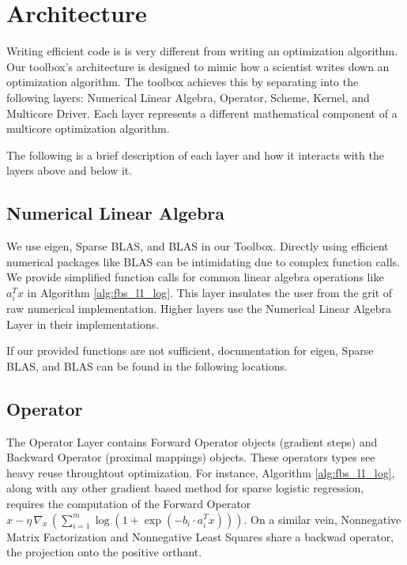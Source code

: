 \section{Architecture}

Writing efficient code is is very different from writing an optimization algorithm.
Our toolbox's architecture is designed to mimic how a scientist writes down an optimization algorithm.
The toolbox achieves this by separating into the following layers: Numerical Linear Algebra, Operator, Scheme, Kernel, and Multicore Driver.
Each layer represents a different mathematical component of a multicore optimization algorithm. 

The following is a brief description of each layer and how it interacts with the layers above and below it.

\subsection{Numerical Linear Algebra}

We use eigen, Sparse BLAS, and BLAS in our Toolbox.
Directly using efficient numerical packages like BLAS can be intimidating due to complex function calls. We provide simplified function calls for common linear algebra operations like $a_i^T x$ in Algorithm \ref{alg:fbs_l1_log}. This layer insulates the user from the grit of raw numerical implementation. Higher layers use the Numerical Linear Algebra Layer in their implementations.

If our provided functions are not sufficient, documentation for eigen, Sparse BLAS, and BLAS can be found in the following locations.

\subsection{Operator}

The Operator Layer contains Forward Operator objects (gradient steps) and Backward Operator (proximal mappings) objects. These operators types see heavy reuse throughtout optimization.
For instance, Algorithm \ref{alg:fbs_l1_log}, along with any other gradient based method for sparse logistic regression, requires the computation of the Forward Operator $x - \eta \, \nabla_x \,(\sum_{i = 1}^m \log (1 + \exp(-b_i \cdot a_i^T x)))$. On a similar vein, Nonnegative Matrix Factorization and Nonnegative Least Squares share a backwad operator, the projection onto the positive orthant.

